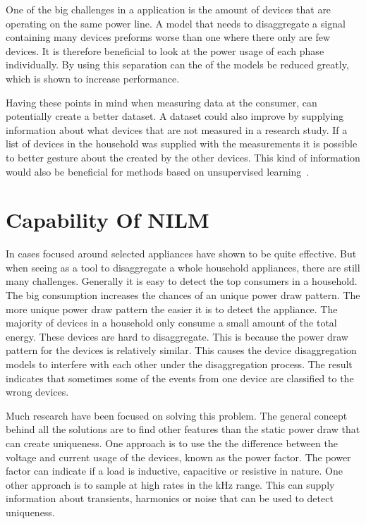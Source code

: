 One of the big challenges in a  application is the amount of devices that are operating on the same power line. A model that needs to disaggregate a signal containing many devices preforms worse than one where there only are few devices. It is therefore beneficial to look at the power usage of each phase individually. By using this separation can the  of the models be reduced greatly, which is shown to increase performance. 

Having these points in mind when measuring data at the consumer, can potentially create a better dataset. A dataset could also improve by supplying information about what devices that are not measured in a research study. If a list of devices in the household was supplied with the measurements it is possible to better gesture about the  created by the other devices. This kind of information would also be beneficial for methods based on unsupervised learning~\citep{RefWorks:19}. 

\section{Capability Of NILM}
In cases focused around selected appliances have  shown to be quite effective. But when seeing  as a tool to disaggregate a whole household appliances, there are still many challenges. Generally it is easy to detect the top consumers in a household. The big consumption increases the chances of an unique power draw pattern. The more unique power draw pattern the easier it is to detect the appliance. The majority of devices in a household only consume a small amount of the total energy. These devices are hard to disaggregate. This is because the power draw pattern for the devices is relatively similar. This causes the device disaggregation models to interfere with each other under the disaggregation process. The result indicates that sometimes some of the events from one device are classified to the wrong devices. 

Much research have been focused on solving this problem. The general concept behind all the solutions are to find other features than the static power draw that can create uniqueness. One approach is to use the the difference between the voltage and current usage of the devices, known as the power factor. The power factor can indicate if a load is inductive, capacitive or resistive in nature. One other approach is to sample at high rates in the kHz range. This can supply information about transients, harmonics or noise that can be used to detect uniqueness.

